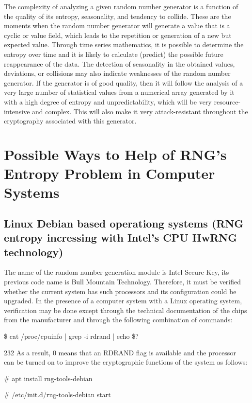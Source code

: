 \documentclass[runningheads]{llncs}
\begin{document}
The complexity of analyzing a given random number generator is a function of the quality of its entropy, seasonality, and tendency to collide. These are the moments when the random number generator will generate a value that is a cyclic or value field, which leads to the repetition or generation of a new but expected value. Through time series mathematics, it is possible to determine the entropy over time and it is likely to calculate (predict) the possible future reappearance of the data. The detection of seasonality in the obtained values, deviations, or collisions may also indicate weaknesses of the random number generator. If the generator is of good quality, then it will follow the analysis of a very large number of statistical values from a numerical array generated by it with a high degree of entropy and unpredictability, which will be very resource-intensive and complex. This will also make it very attack-resistant throughout the cryptography associated with this generator.

\section{Possible Ways to Help of RNG’s Entropy Problem in Computer Systems}
\label{sec:5}

\subsection{Linux Debian based operationg systems (RNG entropy incressing with Intel’s CPU HwRNG technology)}
\label{sub-sec:5-1}

The name of the random number generation module is Intel Secure Key, its previous code name is Bull Mountain Technology. Therefore, it must be verified whether the current system has such processors and its configuration could be upgraded. In the presence of a computer system with a Linux operating system, verification may be done except through the technical documentation of the chips from the manufacturer and through the following combination of commands:

\$ cat /proc/cpuinfo | grep -i rdrand | echo \$?

232
As a result, 0 means that an RDRAND flag is available and the processor can be turned on to improve the cryptographic functions of the system as follows:

\# apt install rng-tools-debian

\# /etc/init.d/rng-tools-debian start
\end{document}
